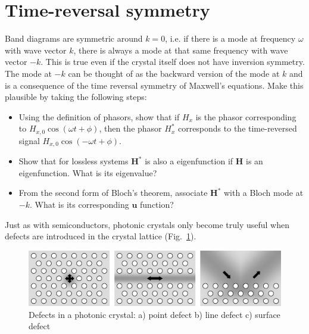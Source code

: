  
\pagebreak

\section{Time-reversal symmetry}

\begin{exer}
Band diagrams are symmetric around $k=0$, i.e. if there is a mode at frequency $\omega$ with wave vector $k$, there is always a mode at that same frequency with wave vector $-k$. This is true even if the crystal itself does not have inversion symmetry. The mode at $-k$ can be thought of as the backward version of the mode at $k$ and is a consequence of the time reversal symmetry of Maxwell's equations. Make this plausible by taking the following steps:
\begin{itemize}
\item Using the definition of phasors, show that if $H_x$ is the phasor corresponding to $ H_{x,0} \cos \left( \omega t + \phi \right)$, then the phasor $H^*_x$ corresponds to the time-reversed signal $ H_{x,0} \cos \left(- \omega t + \phi  \right)$.
\item Show that for lossless systems ${\mathbf H}^*$ is also a eigenfunction if ${\mathbf H}$ is an eigenfunction. What is its eigenvalue?
\item From the second form of Bloch's theorem, associate ${\mathbf H}^*$ with a Bloch mode at $-k$. What is its corresponding ${\mathbf u}$ function?
\end{itemize}

\end{exer}

\pagebreak


Just as with semiconductors, photonic crystals only become truly useful when defects are introduced in the crystal lattice (Fig.~\ref{fig-defects}).

\begin{figure}
\centering
\includegraphics{symmetry/figures/2d_defects}
\caption{Defects in a photonic crystal: a) point defect b) line defect c) surface defect }
\label{fig-defects}
\end{figure}

